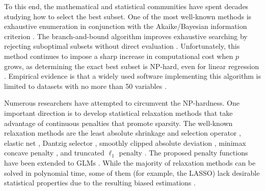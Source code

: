To this end, the mathematical and statistical communities have spent decades studying
how to select the best subset. One of the most well-known methods is exhaustive enumeration in conjunction with the Akaike/Bayesian information criterion \citep{hocking1967selection, akaike1998information, schwarz1978estimating, anderson2004model}.
The branch-and-bound algorithm improves exhaustive searching by rejecting suboptimal subsets without direct evaluation \citep{lamotte1970computational, narendra1977branch}.
Unfortunately,
this method continues to impose a sharp increase in computational cost when $p$ grows, as determining the exact best subset is NP-hard, even for linear regression \citep{natarajan1995sparse}.
Empirical evidence is that a widely used software implementing this algorithm \citep{calcagnoGlmultiPackageEasy2010} is limited to datasets with no more than 50 variables \citep{wen2017bess}.

Numerous researchers have attempted to circumvent the NP-hardness.
One important direction is to develop statistical relaxation methods that take advantage of continuous penalties that promote sparsity.
The well-known relaxation methods are the least absolute shrinkage and selection operator \citep*[LASSO,][]{tibshirani1996regression},
elastic net \citep{zouRegularizationVariableSelection2005},
Dantzig selector \citep{emmanuelcandesDantzigSelectorStatistical2007}, smoothly clipped absolute deviation \citep*[SCAD,][]{fan2001variable},
minimax concave penalty \citep*[MCP, ][]{zhang2010nearly}, and truncated $\ell_1$ penalty \citep{xiaotong2012tlp}.
The proposed penalty functions have been extended to GLMs \citep{parkL1regularizationPathAlgorithm2007, jamesGeneralizedDantzigSelector2009, fan2011scad}.
While the majority of relaxation methods can be solved in polynomial time, some of them (for example, the LASSO) lack desirable statistical properties
due to the resulting biased estimations \citep{zhang2008sparsity}.

